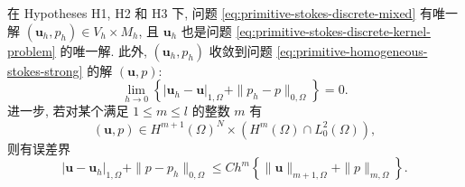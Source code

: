 
\setcounter{statement}{7}
\begin{Theorem}\label{thm:primitive-homogeneous-stokes-convergence}
在 Hypotheses H1, H2 和 H3 下, 问题
\eqref{eq:primitive-stokes-discrete-mixed} 有唯一解
$(\mathbf u_h,p_h)\in V_h\times M_h$, 且 $\mathbf u_h$ 也是问题
\eqref{eq:primitive-stokes-discrete-kernel-problem} 的唯一解. 此外,
$(\mathbf u_h,p_h)$ 收敛到问题
\eqref{eq:primitive-homogeneous-stokes-strong} 的解 $(\mathbf u,p)$:
\begin{equation}\label{eq:primitive-stokes-convergence}
\lim_{h\to0}\left\{
|\mathbf u_h-\mathbf u|_{1,\Omega}
+\|p_h-p\|_{0,\Omega}
\right\}=0.
\end{equation}
进一步, 若对某个满足 $1\leq m\leq l$ 的整数 $m$ 有
\[
(\mathbf u,p)\in H^{m+1}(\Omega)^N
\times(H^m(\Omega)\cap L_0^2(\Omega)),
\]
则有误差界
\begin{equation}\label{eq:primitive-stokes-h1-pressure-error}
|\mathbf u-\mathbf u_h|_{1,\Omega}
+\|p-p_h\|_{0,\Omega}
\leq Ch^m\left\{
\|\mathbf u\|_{m+1,\Omega}+\|p\|_{m,\Omega}
\right\}.
\end{equation}
\end{Theorem}

